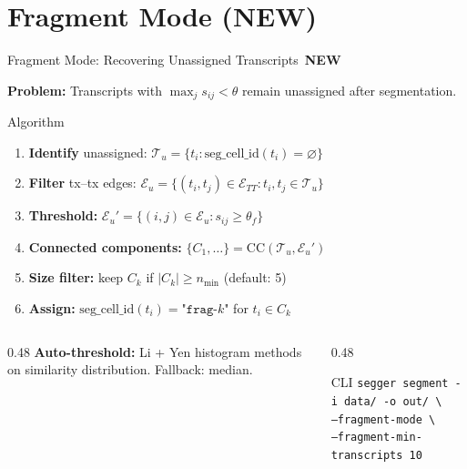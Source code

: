 \documentclass[aspectratio=169,10pt]{beamer}
\newcommand{\edges}{\mathcal{E}}
\newcommand{\Tcal}{\mathcal{T}}
\newcommand{\NEW}{\,{\scriptsize\colorbox{newgreen}{\color{white}\textbf{NEW}}}\,}
\begin{document}
\section{Fragment Mode (NEW)}

\begin{frame}{Fragment Mode: Recovering Unassigned Transcripts \NEW}

\textbf{Problem:} Transcripts with $\max_j s_{ij} < \theta$ remain unassigned after segmentation.

\vspace{0.15cm}

\begin{block}{Algorithm}
{\small
\begin{enumerate}\setlength\itemsep{1pt}
  \item \textbf{Identify} unassigned: $\Tcal_u = \{t_i : \text{seg\_cell\_id}(t_i) = \varnothing\}$
  \item \textbf{Filter} tx--tx edges: $\edges_u = \{(t_i, t_j) \in \edges_{TT} : t_i, t_j \in \Tcal_u\}$
  \item \textbf{Threshold:} $\edges_u' = \{(i,j) \in \edges_u : s_{ij} \geq \theta_f\}$
  \item \textbf{Connected components:} $\{C_1, \ldots\} = \text{CC}(\Tcal_u, \edges_u')$
  \item \textbf{Size filter:} keep $C_k$ if $|C_k| \geq n_{\min}$ (default: 5)
  \item \textbf{Assign:} $\text{seg\_cell\_id}(t_i) = \texttt{"frag-}k\texttt{"}$ for $t_i \in C_k$
\end{enumerate}
}
\end{block}

\vspace{0.1cm}

\begin{columns}[T]
\begin{column}{0.48\textwidth}
{\small
\textbf{Auto-threshold:} Li + Yen histogram methods on similarity distribution. Fallback: median.
}
\end{column}
\begin{column}{0.48\textwidth}
\begin{exampleblock}{CLI}
{\small\texttt{segger segment -i data/ -o out/ \textbackslash\\
\quad --fragment-mode \textbackslash\\
\quad --fragment-min-transcripts 10}}
\end{exampleblock}
\end{column}
\end{columns}
\end{frame}
\end{document}
